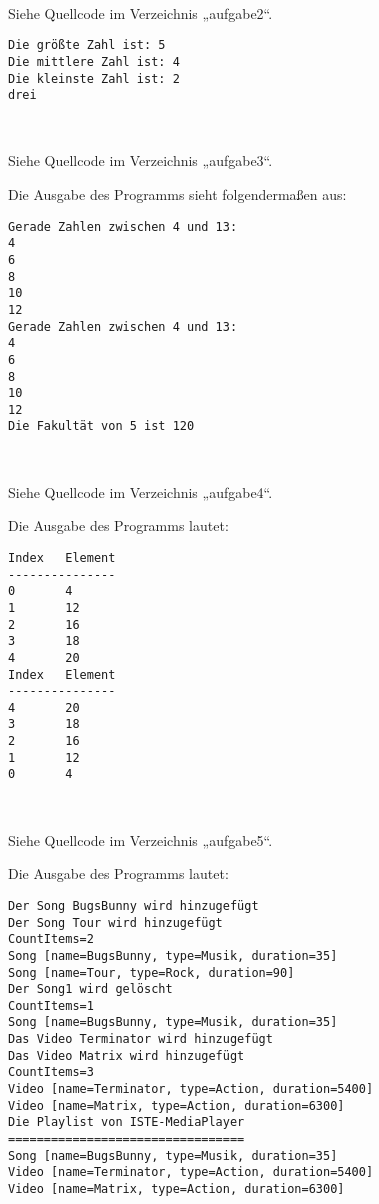 \documentclass[a4paper]{scrartcl}
\begin{document}
\setcounter{aufgabe}{1}

\begin{aufgabe}~

	Siehe Quellcode im Verzeichnis „aufgabe2“.
	\begin{verbatim}
Die größte Zahl ist: 5
Die mittlere Zahl ist: 4
Die kleinste Zahl ist: 2
drei
	\end{verbatim}
\end{aufgabe}

\begin{aufgabe}~

	Siehe Quellcode im Verzeichnis „aufgabe3“.

	Die Ausgabe des Programms sieht folgendermaßen aus:
	\begin{verbatim}
Gerade Zahlen zwischen 4 und 13:
4
6
8
10
12
Gerade Zahlen zwischen 4 und 13:
4
6
8
10
12
Die Fakultät von 5 ist 120
	\end{verbatim}
\end{aufgabe}

\begin{aufgabe}~

	Siehe Quellcode im Verzeichnis „aufgabe4“.

	Die Ausgabe des Programms lautet:
	\begin{verbatim}
Index   Element
---------------
0       4
1       12
2       16
3       18
4       20
Index   Element
---------------
4       20
3       18
2       16
1       12
0       4
	\end{verbatim}
\end{aufgabe}

\begin{aufgabe}~

		
\end{aufgabe}
	Siehe Quellcode im Verzeichnis „aufgabe5“.

	Die Ausgabe des Programms lautet:
	\begin{verbatim}
Der Song BugsBunny wird hinzugefügt
Der Song Tour wird hinzugefügt
CountItems=2
Song [name=BugsBunny, type=Musik, duration=35]
Song [name=Tour, type=Rock, duration=90]
Der Song1 wird gelöscht
CountItems=1
Song [name=BugsBunny, type=Musik, duration=35]
Das Video Terminator wird hinzugefügt
Das Video Matrix wird hinzugefügt
CountItems=3
Video [name=Terminator, type=Action, duration=5400]
Video [name=Matrix, type=Action, duration=6300]
Die Playlist von ISTE-MediaPlayer
=================================
Song [name=BugsBunny, type=Musik, duration=35]
Video [name=Terminator, type=Action, duration=5400]
Video [name=Matrix, type=Action, duration=6300]		
	\end{verbatim}
\end{document}
